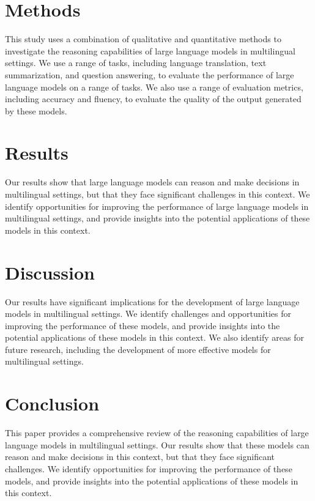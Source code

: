 \documentclass{article}
\begin{document}
\section{Methods}

This study uses a combination of qualitative and quantitative methods to investigate the reasoning capabilities of large language models in multilingual settings. We use a range of tasks, including language translation, text summarization, and question answering, to evaluate the performance of large language models on a range of tasks. We also use a range of evaluation metrics, including accuracy and fluency, to evaluate the quality of the output generated by these models.

\section{Results}

Our results show that large language models can reason and make decisions in multilingual settings, but that they face significant challenges in this context. We identify opportunities for improving the performance of large language models in multilingual settings, and provide insights into the potential applications of these models in this context.

\section{Discussion}

Our results have significant implications for the development of large language models in multilingual settings. We identify challenges and opportunities for improving the performance of these models, and provide insights into the potential applications of these models in this context. We also identify areas for future research, including the development of more effective models for multilingual settings.

\section{Conclusion}

This paper provides a comprehensive review of the reasoning capabilities of large language models in multilingual settings. Our results show that these models can reason and make decisions in this context, but that they face significant challenges. We identify opportunities for improving the performance of these models, and provide insights into the potential applications of these models in this context.
\end{document}
